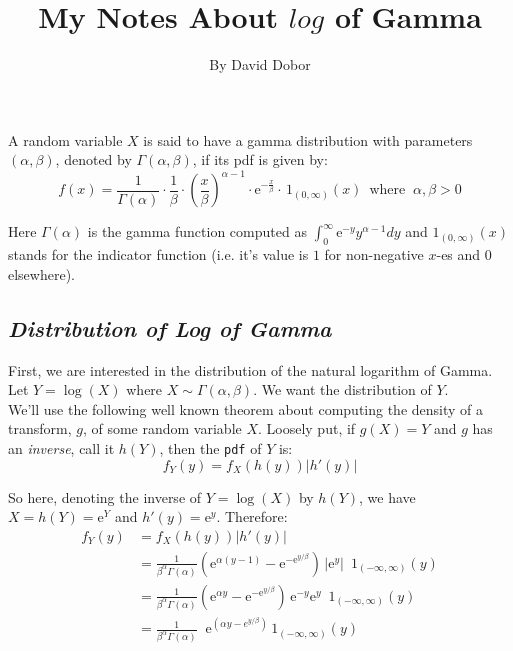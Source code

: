 \documentclass[12pt]{article}
\begin{document}
 \renewcommand{\arraystretch}{1.3}

 
\title{My Notes About $log$ of Gamma}%
\author{By David Dobor} %
 
\maketitle

 A random variable $X$ is said to have a gamma distribution with parameters $(\alpha, \beta)$, denoted by  $\Gamma(\alpha, \beta)$, if its  pdf is given by:
$$
		f(x) = \frac{1}{\Gamma({\alpha})} \cdot \frac{1}{\beta} \cdot  \left( \frac{x}{\beta}\right)^{\alpha - 1} \cdot \mathrm{e}^{-\frac{x}{\beta}} \cdot\, 1_{(0,\infty)}(x) \,\,\, \text{where} \;\; \alpha, \beta > 0
$$

Here $\Gamma(\alpha)$ is the gamma function computed as $\int_0^{\infty} \mathrm{e}^{-y} y^{\alpha - 1} dy$ and $1_{(0,\infty)}(x)$ stands for the indicator function (i.e. it's value is $1$ for non-negative $x$-es and $0$ elsewhere). 


\bigskip


\begin{center}
\subsection*{\color{TealBlue}\emph{Distribution of Log of Gamma} }
\end{center}

First, we are interested in the distribution of the natural logarithm of Gamma. \\
Let $Y = \log (X)$ where  $X\sim\Gamma(\alpha,\beta)$.  We want the distribution of $Y$. \\

We'll use the following well known theorem about computing the density of a transform, $g$, of some random variable $X$. Loosely put, if $g(X) = Y$ and $g$ has an \emph{inverse}, call it $h(Y)$, then the \texttt{pdf} of $Y$ is:
$$
f_Y(y) = f_X(h(y)) |h'(y)|
$$

So here, denoting the inverse of $Y = \log (X)$ by $h(Y)$, we have $ X=h(Y)=\mathrm{e}^Y$ and $h'(y) = \mathrm{e}^{y}$. Therefore:
\begin{align*}
 f_Y(y) &= f_X(h(y)) |h'(y)| \\
 &= \frac{1}{\beta^\alpha \Gamma(\alpha)} \left(\mathrm{e}^{\alpha (y - 1)} - \mathrm{e}^{-\mathrm{e}^{y/\beta}}\right)\,|\mathrm{e}^{y}| \,\,\,1_{(-\infty,\infty)}(y) \\
  &= \frac{1}{\beta^\alpha \Gamma(\alpha)} \left(\mathrm{e}^{\alpha y} - \mathrm{e}^{-\mathrm{e}^{y/\beta}}\right)\,\mathrm{e}^{-y}\mathrm{e}^{y} \,\,\,1_{(-\infty,\infty)}(y) \\
 &= \frac{1}{\beta^\alpha \Gamma(\alpha)} \;\; \mathrm{e}^{\left(\alpha y - e^{y/\beta}\right)}\,1_{(-\infty,\infty)}(y) \\
\end{align*}
\end{document}
